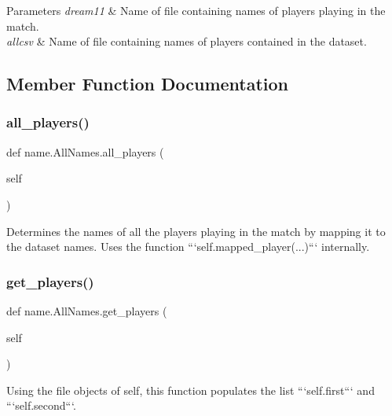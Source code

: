 \begin{DoxyParams}{Parameters}
{\em dream11} & Name of file containing names of players playing in the match. \\
\hline
{\em allcsv} & Name of file containing names of players contained in the dataset. \\
\hline
\end{DoxyParams}


\subsection{Member Function Documentation}
\mbox{\label{classname_1_1AllNames_a9de21d794d9868b1d42fb103f6643ba7}} 
\subsubsection{\texorpdfstring{all\+\_\+players()}{all\_players()}}
{\footnotesize\ttfamily def name.\+All\+Names.\+all\+\_\+players (\begin{DoxyParamCaption}\item[{}]{self }\end{DoxyParamCaption})}

\begin{DoxyVerb}Determines the names of all the players playing in the match by mapping it to the dataset names. Uses the function ```self.mapped_player(...)``` internally.
\end{DoxyVerb}
 \mbox{\label{classname_1_1AllNames_a766b1d340e8df73fa313e7ceec65c150}} 
\subsubsection{\texorpdfstring{get\+\_\+players()}{get\_players()}}
{\footnotesize\ttfamily def name.\+All\+Names.\+get\+\_\+players (\begin{DoxyParamCaption}\item[{}]{self }\end{DoxyParamCaption})}

\begin{DoxyVerb}Using the file objects of self, this function populates the list ```self.first``` and ```self.second```.
\end{DoxyVerb}
 \mbox{\label{classname_1_1AllNames_a9cd51d0c9394ed62cfc62c688dc5434f}} 
